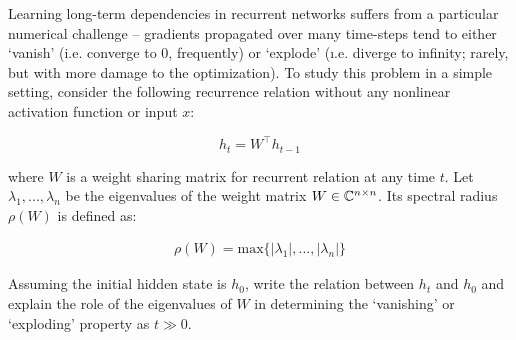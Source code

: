 Learning long-term dependencies in recurrent networks suffers from a particular numerical challenge -- 
gradients propagated over many time-steps tend to either `vanish' (i.e. converge to 0, frequently) or `explode' (\i.e. diverge to infinity; rarely, but with more damage to the optimization). To study this problem in a simple setting, consider the following recurrence relation without any nonlinear activation function or input $x$:

\begin{equation} \label{eq:simple_recurrence}
h_{t} = W^\top h_{t-1}
\end{equation}

where $W$ is a weight sharing matrix for recurrent relation at any time $t$. Let $\lambda_1, ..., \lambda_n$ be the eigenvalues of the weight matrix $W \in \mathbb{C}^{n \times n}$. Its spectral radius $\rho(W)$ is defined as: 

\begin{align}
\rho(W) = \text{max}\{|\lambda_1|, ... ,|\lambda_n| \}
\end{align}

Assuming the initial hidden state is $h_0$, write the relation between $h_t$ and $h_0$ and explain the role of the eigenvalues of $W$ in determining the `vanishing' or `exploding' property as $t\gg0$.